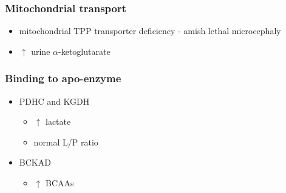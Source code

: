 \documentclass{scrartcl}
\begin{document}
\subsubsection{Mitochondrial transport}
\label{sec:orgffba9ee}
\begin{itemize}
\item mitochondrial TPP transporter deficiency - amish lethal microcephaly
\item \(\uparrow\) urine \(\alpha\)-ketoglutarate
\end{itemize}
\subsubsection{Binding to apo-enzyme}
\label{sec:orgcd6294b}
\begin{itemize}
\item PDHC and KGDH
\begin{itemize}
\item \(\uparrow\) lactate
\item normal L/P ratio
\end{itemize}
\item BCKAD
\begin{itemize}
\item \(\uparrow\) BCAAs
\end{itemize}
\end{itemize}
\end{document}
